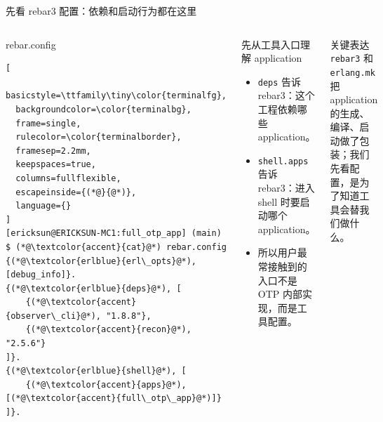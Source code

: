 \documentclass[aspectratio=169, 9pt]{beamer}
\newcommand{\code}[1]{\texttt{#1}}
\begin{document}
\begin{frame}[fragile]{先看 rebar3 配置：依赖和启动行为都在这里}
  \begin{columns}[T,onlytextwidth]
    \begin{block}{rebar.config}
\begin{lstlisting}[
  basicstyle=\ttfamily\tiny\color{terminalfg},
  backgroundcolor=\color{terminalbg},
  frame=single,
  rulecolor=\color{terminalborder},
  framesep=2.2mm,
  keepspaces=true,
  columns=fullflexible,
  escapeinside={(*@}{@*)},
  language={}
]
[ericksun@ERICKSUN-MC1:full_otp_app] (main) $ (*@\textcolor{accent}{cat}@*) rebar.config
{(*@\textcolor{erlblue}{erl\_opts}@*), [debug_info]}.
{(*@\textcolor{erlblue}{deps}@*), [
    {(*@\textcolor{accent}{observer\_cli}@*), "1.8.8"},
    {(*@\textcolor{accent}{recon}@*), "2.5.6"}
]}.
{(*@\textcolor{erlblue}{shell}@*), [
    {(*@\textcolor{accent}{apps}@*), [(*@\textcolor{accent}{full\_otp\_app}@*)]}
]}.
\end{lstlisting}
    \end{block}
    \footnotesize
    \begin{block}{先从工具入口理解 application}
      \begin{itemize}
        \item \code{deps} 告诉 rebar3：这个工程依赖哪些 application。
        \item \code{shell.apps} 告诉 rebar3：进入 shell 时要启动哪个 application。
        \item 所以用户最常接触到的入口不是 OTP 内部实现，而是工具配置。
      \end{itemize}
    \end{block}
    \vspace{0.15cm}
    \begin{alertblock}{关键表达}
      \code{rebar3} 和 \code{erlang.mk} 把 application 的生成、编译、启动做了包装；我们先看配置，是为了知道工具会替我们做什么。
    \end{alertblock}
  \end{columns}
\end{frame}
\end{document}

